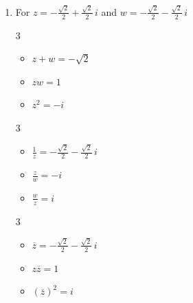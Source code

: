 \documentclass{ximera}
\begin{document}
\begin{enumerate}
\begin{multicols}{3}
\begin{itemize}
\end{itemize}

\end{multicols}

\item  For   $z = -\frac{\sqrt{2}}{2} + \frac{\sqrt{2}}{2} \, i$ and $w = -\frac{\sqrt{2}}{2} - \frac{\sqrt{2}}{2} \, i$

\begin{multicols}{3}

\begin{itemize}

\item $z + w = -\sqrt{2}$

\item $zw = 1$

\item $z^2 =-i$

\end{itemize}

\end{multicols}

\begin{multicols}{3}

\begin{itemize}

\item $\frac{1}{z} = -\frac{\sqrt{2}}{2} - \frac{\sqrt{2}}{2} \, i$

\item $\frac{z}{w} = -i$

\item $\frac{w}{z} = i$

\end{itemize}

\end{multicols}

\begin{multicols}{3}

\begin{itemize}

\item $\overline{z} = -\frac{\sqrt{2}}{2} - \frac{\sqrt{2}}{2} \, i$

\item $z\overline{z} = 1$

\item $(\overline{z})^2 = i$

\end{itemize}
\end{multicols}
\setcounter{HW}{\value{enumi}}
\end{enumerate}
\end{document}

